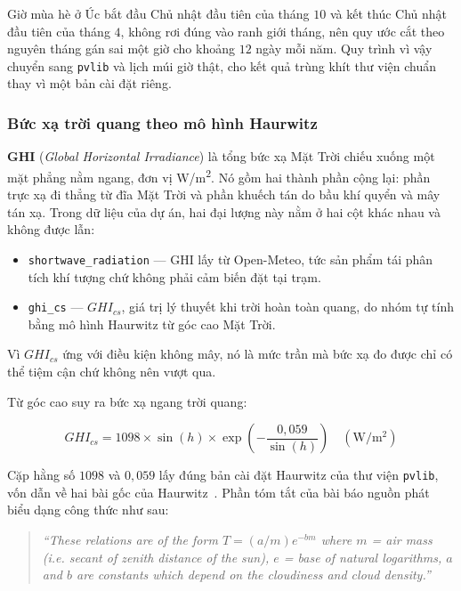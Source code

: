 \documentclass[12pt, a4paper]{report}
\begin{document}
Giờ mùa hè ở Úc bắt đầu Chủ nhật đầu tiên của tháng $10$ và kết thúc Chủ nhật đầu tiên của
tháng $4$, không rơi đúng vào ranh giới tháng, nên quy ước cắt theo nguyên tháng gán sai một
giờ cho khoảng $12$ ngày mỗi năm. Quy trình vì vậy chuyển sang \texttt{pvlib} và lịch múi giờ
thật, cho kết quả trùng khít thư viện chuẩn thay vì một bản cài đặt riêng.

\subsubsection{Bức xạ trời quang theo mô hình Haurwitz}

\textbf{GHI} (\textit{Global Horizontal Irradiance}) là tổng bức xạ Mặt Trời chiếu
xuống một mặt phẳng nằm ngang, đơn vị W/m\textsuperscript{2}. Nó gồm hai thành phần cộng
lại: phần trực xạ đi thẳng từ đĩa Mặt Trời và phần khuếch tán do bầu khí quyển và mây tán
xạ. Trong dữ liệu của dự án, hai đại lượng này nằm ở hai cột khác nhau và không được
lẫn:

\begin{itemize}
    \item \texttt{shortwave\_radiation} --- GHI lấy từ Open-Meteo, tức sản phẩm tái phân tích khí tượng chứ không phải cảm biến đặt tại trạm.
    \item \texttt{ghi\_cs} --- $GHI_{cs}$, giá trị lý thuyết khi trời hoàn toàn quang, do nhóm
    tự tính bằng mô hình Haurwitz từ góc cao Mặt Trời.
\end{itemize}

Vì $GHI_{cs}$ ứng với điều kiện không mây, nó là mức trần mà bức xạ đo được chỉ có thể tiệm
cận chứ không nên vượt qua.

Từ góc cao suy ra bức xạ ngang trời quang:

\begin{equation}
GHI_{cs} = 1098 \times \sin(h) \times \exp\!\left(-\frac{0{,}059}{\sin(h)}\right)
\quad (\mathrm{W/m^2})
\end{equation}

Cặp hằng số $1098$ và $0{,}059$ lấy đúng bản cài đặt Haurwitz của thư viện \texttt{pvlib},
vốn dẫn về hai bài gốc của Haurwitz~\cite{haurwitz1945}. Phần tóm tắt của bài báo
nguồn phát biểu dạng công thức như sau:

\begin{quote}\small
\textit{``These relations are of the form $T = (a/m)e^{-bm}$ where $m$ = air mass (i.e. secant of zenith distance of the sun), $e$ = base of natural logarithms, $a$ and $b$ are constants which depend on the cloudiness and cloud density.''}
\end{quote}
\end{document}
